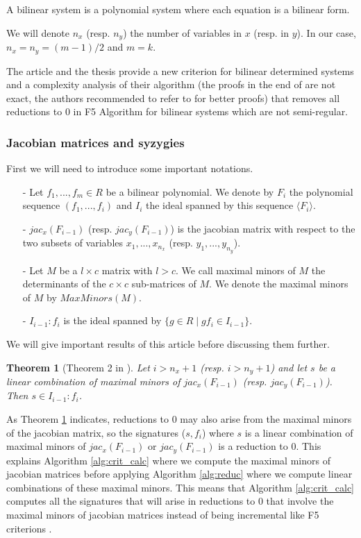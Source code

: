 \documentclass[english]{article}
\newtheorem{theorem}{Theorem}[section]
\begin{document}
		A bilinear system is a polynomial system where each equation is a bilinear form.
		
		We will denote $n_x$ (resp. $n_y$) the number of variables in $x$ (resp. in $y$). In our case, $n_x = n_y = (m-1)/2$ and $m = k$.
		
		The article \cite{FSS11} and the thesis \cite{Spaen2012} provide a new criterion for bilinear determined systems and a complexity analysis of their algorithm (the proofs in the end of \cite{FSS11} are not exact, the authors recommended to refer to \cite{Spaen2012} for better proofs) that removes all reductions to 0 in F5 Algorithm for bilinear systems which are not semi-regular.
		
		\subsubsection{Jacobian matrices and syzygies}
		First we will need to introduce some important notations.
		\begin{itemize}
			\item[-] Let $f_1,...,f_m \in R$ be a bilinear polynomial. We denote by $F_i$ the polynomial sequence $(f_1,...,f_i)$ and $I_i$ the ideal spanned by this sequence $\langle F_i \rangle$.
			\item[-] $jac_{x}(F_{i-1})$ (resp. $jac_{y}(F_{i-1})$) is the jacobian matrix with respect to the two subsets of variables $x_1,...,x_{n_x}$ (resp. $y_1,...,y_{n_y}$).
			\item[-] Let $M$ be a $l \times c$ matrix with $l > c$. We call maximal minors of $M$ the determinants of the $c \times c$ sub-matrices of $M$. We denote the maximal minors of $M$ by $MaxMinors(M)$.
			\item[-] $I_{i-1} : f_i$ is the ideal spanned by $\{g \in R \mid gf_i \in I_{i-1}\}$.
		\end{itemize}
		We will give important results of this article before discussing them further.
		
		\begin{theorem}[Theorem 2 in \cite{FSS11}]\label{theoremMaxMin}
			Let $i > n_x + 1$ (resp. $i > n_y + 1$) and let $s$ be a linear combination of maximal minors of $jac_{x}(F_{i-1})$ (resp. $jac_{y}(F_{i-1})$). Then $s \in I_{i-1} : f_i$.
		\end{theorem}
		
		As Theorem \ref{theoremMaxMin} indicates, reductions to 0 may also arise from the maximal minors of the jacobian matrix, so the signatures ($s, f_i$) where $s$ is a linear combination of maximal minors of $jac_{x}(F_{i-1})$ or $jac_{y}(F_{i-1})$ is a reduction to 0.
		This explains Algorithm \ref{alg:crit_calc} where we compute the maximal minors of jacobian matrices before applying Algorithm \ref{alg:reduc} where we compute linear combinations of these maximal minors.
		This means that Algorithm \ref{alg:crit_calc} computes all the signatures that will arise in reductions to 0 that involve the maximal minors of jacobian matrices instead of being incremental like F5 criterions \cite{F02}.
		
\end{document}
